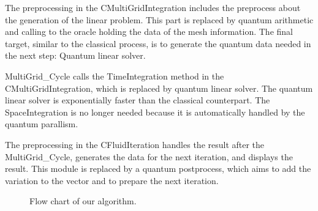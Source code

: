 \documentclass[%
 reprint,
 amsmath,amssymb,
pra,
]{revtex4-1}
\begin{document}
The preprocessing in the CMultiGridIntegration includes the preprocess about the generation of the linear problem. This part is replaced by quantum arithmetic and calling to the oracle holding the data of the mesh information. The final target, similar to the classical process, is to generate the quantum data needed in the next step: Quantum linear solver.

MultiGrid_Cycle calls the TimeIntegration method in the CMultiGridIntegration, which is replaced by quantum linear solver. The quantum linear solver is exponentially faster than the classical counterpart. The SpaceIntegration is no longer needed because it is automatically handled by the quantum parallism.

The preprocessing in the CFluidIteration handles the result after the MultiGrid_Cycle, generates the data for the next iteration, and displays the result. This module is replaced by a quantum postprocess, which aims to add the variation to the vector and to prepare the next iteration. 

\begin{figure}[htbp]
     \caption{Flow chart of our algorithm.}
    \label{CfdFlowChart}
\end{figure}
\end{document}
